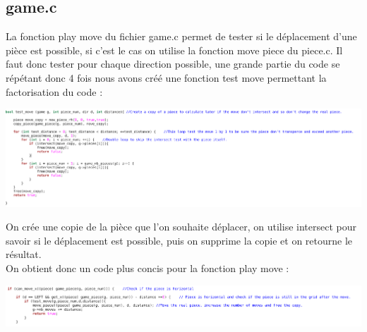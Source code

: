 \documentclass{article}
\begin{document}
\subsection {game.c}
La fonction play move du fichier game.c permet de tester si le déplacement d'une pièce est possible, si c'est le cas on utilise la fonction move piece du piece.c. Il faut donc tester pour chaque direction possible, une grande partie du code se répétant donc 4 fois nous avons créé une fonction test move permettant la factorisation du code :
\begin{flushleft}
\includegraphics[scale=0.45]{test_move.png}
\end{flushleft}
On crée une copie de la pièce que l'on souhaite déplacer, on utilise intersect pour savoir si le déplacement est possible, puis on supprime la copie et on retourne le résultat.\\ 
On obtient donc un code plus concis pour la fonction play move : 
\begin{flushleft}
\includegraphics[scale=0.45]{play_move.png}
\end{flushleft}
\end{document}
